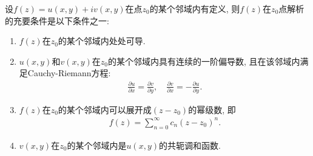 \documentclass[../../main.tex]{subfiles}%
\begin{document}
\begin{theorem}[函数在一点解析的充要条件]\label{theorem:函数在一点解析的充要条件}
设$f(z)=u(x,y)+iv(x,y)$在点$z_0$的某个邻域内有定义, 则$f(z)$在$z_0$点解析的充要条件是以下条件之一:
\begin{enumerate}[(1)]
\item $f(z)$在$z_0$的某个邻域内处处可导.
\item $u(x,y)$和$v(x,y)$在$z_0$的某个邻域内具有连续的一阶偏导数, 且在该邻域内满足Cauchy-Riemann方程:
\begin{align*}
\frac{\partial u}{\partial x} = \frac{\partial v}{\partial y}, \quad \frac{\partial v}{\partial x} = -\frac{\partial u}{\partial y}.
\end{align*}
\item $f(z)$在$z_0$的某个邻域内可以展开成$(z-z_0)$的幂级数, 即
\begin{align*}
f(z) = \sum\limits_{n=0}^{\infty} c_n (z-z_0)^n.
\end{align*}
\item $v(x,y)$在$z_0$的某个邻域内是$u(x,y)$的共轭调和函数.
\end{enumerate}
\end{theorem}
\end{document}
